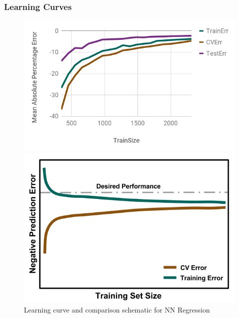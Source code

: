\begin{frame}
  \frametitle{Learning Curves}
  \begin{figure}
    \begin{minipage}{0.65\textwidth}
      \centering
      \includegraphics[width=\linewidth]{./figures/lc1.png}
    \end{minipage}%
    \begin{minipage}{0.35\textwidth}
      \centering
      \includegraphics[width=\linewidth]{./figures/NegLearningCurve-ideal.png}
    \end{minipage}
    \caption{Learning curve and comparison schematic for NN Regression}
  \end{figure}
\end{frame}

